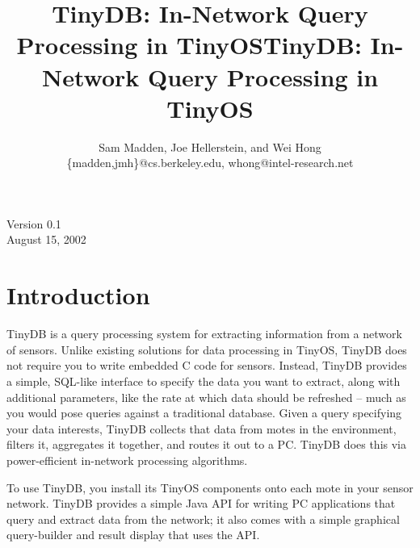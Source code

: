 \documentclass[11pt]{article}
\title{\vspace{2.5in} TinyDB:  In-Network Query Processing in TinyOS}
\title{TinyDB:  In-Network Query Processing in TinyOS}
\author{Sam Madden, Joe Hellerstein, and Wei Hong \\
	\{madden,jmh\}@cs.berkeley.edu, whong@intel-research.net}
\date{}
\begin{document}

\maketitle
\begin{latexonly}
\vspace{2in}
\end{latexonly}
\begin{center}
Version 0.1 \\
August 15, 2002
\end{center}


\thispagestyle{empty}
\begin{latexonly}\newpage\end{latexonly}
\tableofcontents
\begin{latexonly}\newpage\end{latexonly}
\section{Introduction}

TinyDB is a query processing system for extracting
information from a network of
sensors. Unlike existing
solutions for data processing in TinyOS,
TinyDB does not require you to write embedded C
code for sensors.
Instead, TinyDB provides a
simple, SQL-like interface to specify the data you want to
extract, along with additional parameters, like the rate at which data
should be refreshed -- much as you would pose queries against a
traditional database.  
Given a query specifying your data interests,
TinyDB collects that data from motes in the
environment, filters it, aggregates it together, and routes it out to
a PC.  TinyDB does this via power-efficient in-network
processing algorithms.

To use TinyDB, you install its TinyOS components onto
each mote in your sensor network. 
TinyDB provides a simple
Java API for writing PC applications that query and extract data from
the network; it also comes with a simple graphical query-builder and
result display that uses the API.
\end{document}
